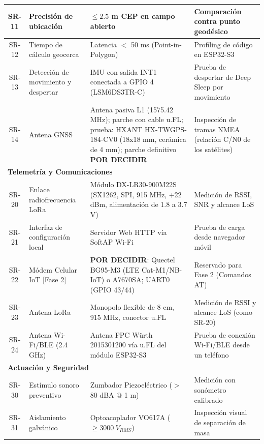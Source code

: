 \begin{table}[H]
\begin{tabularx}{\textwidth}{|c X X X|}
SR-11 & Precisión de ubicación & $\le 2.5$ m CEP en campo abierto & Comparación contra punto geodésico \\ \hline
SR-12 & Tiempo de cálculo geocerca & Latencia $<$ 50 ms (Point-in-Polygon) & Profiling de código en ESP32-S3 \\ \hline
SR-13 & Detección de movimiento y despertar & IMU con salida INT1 conectada a GPIO 4 (LSM6DS3TR-C) & Prueba de despertar de Deep Sleep por movimiento \\ \hline
SR-14 & Antena GNSS & Antena pasiva L1 (1575.42 MHz); parche con cable u.FL; prueba: HXANT HX-TWGPS-184-CV0 (18x18 mm, cerámica de 4 mm); parche definitivo \textbf{POR DECIDIR} & Inspección de tramas NMEA (relación C/N0 de los satélites) \\ \hline
\multicolumn{4}{|l|}{\cellcolor{categorybgsub}\textbf{Telemetría y Comunicaciones}} \\ \hline
SR-20 & Enlace radiofrecuencia LoRa & Módulo DX-LR30-900M22S (SX1262, SPI, 915 MHz, +22 dBm, alimentación de 1.8 a 3.7 V) & Medición de RSSI, SNR y alcance LoS \\ \hline
SR-21 & Interfaz de configuración local & Servidor Web HTTP vía SoftAP Wi-Fi & Prueba de carga desde navegador móvil \\ \hline
SR-22 & Módem Celular IoT [Fase 2] & \textbf{POR DECIDIR}: Quectel BG95-M3 (LTE Cat-M1/NB-IoT) o A7670SA; UART0 (GPIO 43/44) & Reservado para Fase 2 (Comandos AT) \\ \hline
SR-23 & Antena LoRa & Monopolo flexible de 8 cm, 915 MHz, conector u.FL & Medición de RSSI y alcance LoS (como SR-20) \\ \hline
SR-24 & Antena Wi-Fi/BLE (2.4 GHz) & Antena FPC Würth 2015301200 vía u.FL del módulo ESP32-S3 & Prueba de conexión Wi-Fi/BLE desde un teléfono \\ \hline
\multicolumn{4}{|l|}{\cellcolor{categorybgsub}\textbf{Actuación y Seguridad}} \\ \hline
SR-30 & Estímulo sonoro preventivo & Zumbador Piezoeléctrico ($>$ 80 dBA @ 1 m) & Medición con sonómetro calibrado \\ \hline
SR-31 & Aislamiento galvánico & Optoacoplador VO617A ($\ge 3000~V_{RMS}$) & Inspección visual de separación de masa \\ \hline
\end{tabularx}
\end{table}